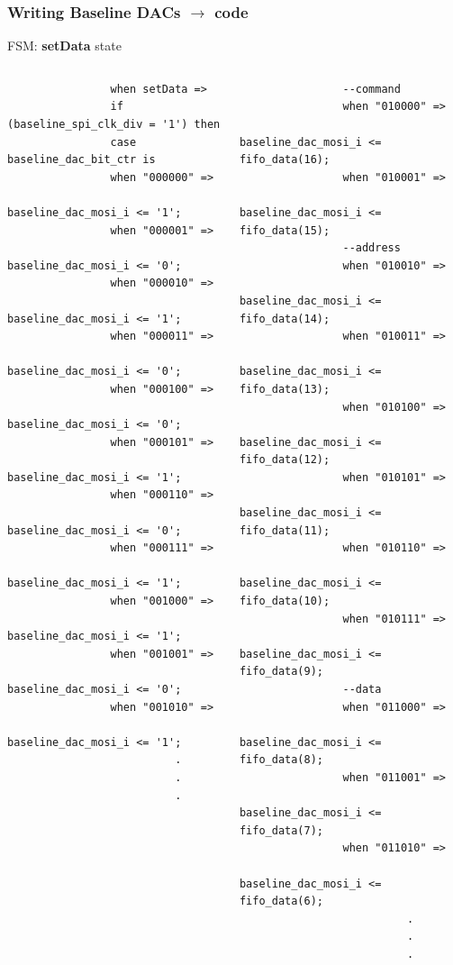 \documentclass[aspectratio=169]{beamer}
\begin{document}
	\begin{frame}[fragile]
	\frametitle{Writing Baseline DACs $\rightarrow$ code}
	\begin{center}
		FSM: \textbf{setData} state
	\end{center}
	{\tiny
		\begin{columns}
			
			\begin{center}
				\begin{verbatim}
				when setData =>
				if (baseline_spi_clk_div = '1') then
				case baseline_dac_bit_ctr is
				when "000000" =>
				baseline_dac_mosi_i <= '1';
				when "000001" =>
				baseline_dac_mosi_i <= '0';
				when "000010" =>
				baseline_dac_mosi_i <= '1';
				when "000011" => 
				baseline_dac_mosi_i <= '0';		
				when "000100" =>
				baseline_dac_mosi_i <= '0';
				when "000101" =>
				baseline_dac_mosi_i <= '1';
				when "000110" =>
				baseline_dac_mosi_i <= '0';
				when "000111" =>
				baseline_dac_mosi_i <= '1';		
				when "001000" =>
				baseline_dac_mosi_i <= '1';
				when "001001" =>
				baseline_dac_mosi_i <= '0';
				when "001010" =>
				baseline_dac_mosi_i <= '1';
				          .
				          .
				          .
				\end{verbatim}
			\end{center}
			
			\begin{center}
				\begin{verbatim}
				--command
				when "010000" =>
				baseline_dac_mosi_i <= fifo_data(16); 
				when "010001" =>
				baseline_dac_mosi_i <= fifo_data(15); 
				--address
				when "010010" =>
				baseline_dac_mosi_i <= fifo_data(14); 
				when "010011" =>
				baseline_dac_mosi_i <= fifo_data(13); 
				when "010100" =>
				baseline_dac_mosi_i <= fifo_data(12); 
				when "010101" =>
				baseline_dac_mosi_i <= fifo_data(11); 
				when "010110" =>
				baseline_dac_mosi_i <= fifo_data(10); 
				when "010111" =>
				baseline_dac_mosi_i <= fifo_data(9);  
				--data
				when "011000" =>
				baseline_dac_mosi_i <= fifo_data(8);  
				when "011001" =>
				baseline_dac_mosi_i <= fifo_data(7);  
				when "011010" =>
				baseline_dac_mosi_i <= fifo_data(6);  
				          .
				          .
				          .
				\end{verbatim}
			\end{center}
		\end{columns} 
	}
	\end{frame}
\end{document}
